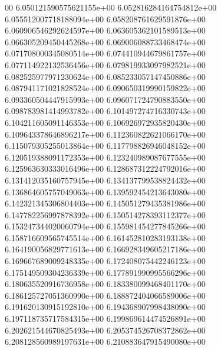 00	6.050121590575621155e+00	6.052816284164754812e+00	6.055512007718188094e+00	6.058208761629591876e+00	6.060906546292624597e+00	6.063605362101589513e+00	6.066305209450445268e+00	6.069006088733468474e+00	6.071708000345080514e+00	6.074410944679861757e+00	6.077114922132536456e+00	6.079819933097982521e+00	6.082525977971230624e+00	6.085233057147450886e+00	6.087941171021828524e+00	6.090650319990159822e+00	6.093360504447915993e+00	6.096071724790883550e+00	6.098783981414993782e+00	6.101497274716330743e+00	6.104211605091146353e+00	6.106926972935820430e+00	6.109643378646896217e+00	6.112360822621066170e+00	6.115079305255013864e+00	6.117798826946048152e+00	6.120519388091172353e+00	6.123240989087677555e+00	6.125963630333016496e+00	6.128687312224792016e+00	6.131412035160757945e+00	6.134137799538824432e+00	6.136864605757049063e+00	6.139592454213643080e+00	6.142321345306804403e+00	6.145051279435381986e+00	6.147782256997878392e+00	6.150514278393112377e+00	6.153247344020060794e+00	6.155981454277845266e+00	6.158716609565745514e+00	6.161452810283193138e+00	6.164190056829771613e+00	6.166928349605217186e+00	6.169667689009248335e+00	6.172408075442246123e+00	6.175149509304236339e+00	6.177891990995566296e+00	6.180635520916736958e+00	6.183380099468401170e+00	6.186125727051360990e+00	6.188872404066589006e+00	6.191620130915192810e+00	6.194368907998438090e+00	6.197118735717584315e+00	6.199869614474526891e+00	6.202621544670825493e+00	6.205374526708372862e+00	6.208128560989197631e+00	6.210883647915490080e+00
